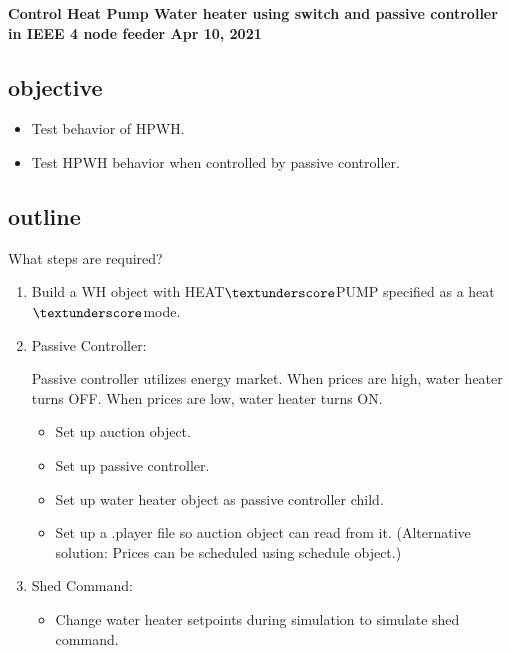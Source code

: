 \textbf{Control Heat Pump Water heater using switch and passive controller in IEEE 4 node feeder Apr 10, 2021}
\subsection{objective} 
    \begin{itemize}
        \item Test behavior of HPWH.
        \item Test HPWH behavior when controlled by passive controller.
    \end{itemize}

\subsection{outline}
    
    What steps are required?
    \begin{enumerate}
        \item Build a WH object with HEAT$\textunderscore$PUMP specified as a heat$\textunderscore$mode.
        \item Passive Controller:\par
        Passive controller utilizes energy market. When prices are high, water heater turns OFF. When prices are low, water heater turns ON.
        \begin{itemize}
            \item Set up auction object.
            \item Set up passive controller.
            \item Set up water heater object as passive controller child.
            \item Set up a .player file so auction object can read from it. (Alternative solution: Prices can be scheduled using schedule object.)
        \end{itemize}
        \item Shed Command:
        \begin{itemize}
            \item Change water heater setpoints during simulation to simulate shed command.
        \end{itemize}
    \end{enumerate}
